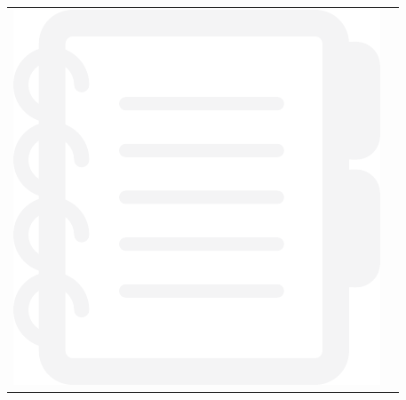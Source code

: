 {{\begin{multicols}{2}
\begin{center}
\begin{lscshdrbox}
\begin{tabu}{X[1,c,m] X[2,l,m]}
\vspace{0pt}
\includegraphics[scale=0.15]{figures/component-supplement.pdf}
&
\vspace{0pt}
\textcolor{white}{\textbf{\selectfont {INSTRUCTOR SUPPLEMENTS}}}
\end{tabu}
\end{lscshdrbox}
\end{center}
\end{multicols}
}



\vfill
{\small
\begin{center}
	\textcolor{titletextcolour}{\textbf{\selectfont {Contact Lyryx Today!}}} \\
\medskip
\textcolor{titletextcolour}{\textbf{\selectfont {info@lyryx.com}}} \\

\end{center}
}
\vfill

}

